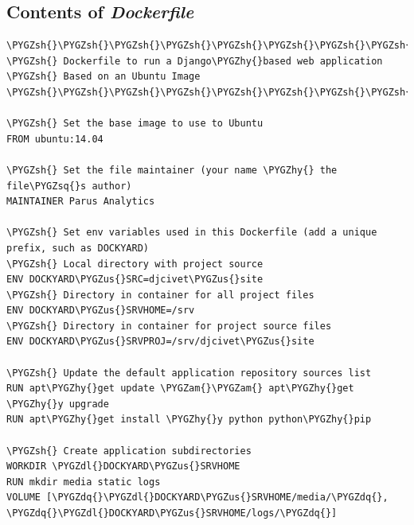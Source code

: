 \documentclass[letterpaper,10pt,english]{sphinxmanual}
\def\PYGZus{\char`\_}
\def\PYGZam{\char`\&}
\def\PYGZsh{\char`\#}
\def\PYGZdl{\char`\$}
\def\PYGZhy{\char`\-}
\def\PYGZsq{\char`\'}
\def\PYGZdq{\char`\"}
\renewcommand\PYGZsq{\textquotesingle}
\begin{document}
\subsection{Contents of \emph{Dockerfile}}
\label{appendix4:contents-of-dockerfile}
\begin{Verbatim}[commandchars=\\\{\}]
\PYGZsh{}\PYGZsh{}\PYGZsh{}\PYGZsh{}\PYGZsh{}\PYGZsh{}\PYGZsh{}\PYGZsh{}\PYGZsh{}\PYGZsh{}\PYGZsh{}\PYGZsh{}\PYGZsh{}\PYGZsh{}\PYGZsh{}\PYGZsh{}\PYGZsh{}\PYGZsh{}\PYGZsh{}\PYGZsh{}\PYGZsh{}\PYGZsh{}\PYGZsh{}\PYGZsh{}\PYGZsh{}\PYGZsh{}\PYGZsh{}\PYGZsh{}\PYGZsh{}\PYGZsh{}\PYGZsh{}\PYGZsh{}\PYGZsh{}\PYGZsh{}\PYGZsh{}\PYGZsh{}\PYGZsh{}\PYGZsh{}\PYGZsh{}\PYGZsh{}\PYGZsh{}\PYGZsh{}\PYGZsh{}\PYGZsh{}\PYGZsh{}\PYGZsh{}\PYGZsh{}\PYGZsh{}\PYGZsh{}\PYGZsh{}\PYGZsh{}\PYGZsh{}\PYGZsh{}\PYGZsh{}\PYGZsh{}\PYGZsh{}\PYGZsh{}\PYGZsh{}\PYGZsh{}\PYGZsh{}
\PYGZsh{} Dockerfile to run a Django\PYGZhy{}based web application
\PYGZsh{} Based on an Ubuntu Image
\PYGZsh{}\PYGZsh{}\PYGZsh{}\PYGZsh{}\PYGZsh{}\PYGZsh{}\PYGZsh{}\PYGZsh{}\PYGZsh{}\PYGZsh{}\PYGZsh{}\PYGZsh{}\PYGZsh{}\PYGZsh{}\PYGZsh{}\PYGZsh{}\PYGZsh{}\PYGZsh{}\PYGZsh{}\PYGZsh{}\PYGZsh{}\PYGZsh{}\PYGZsh{}\PYGZsh{}\PYGZsh{}\PYGZsh{}\PYGZsh{}\PYGZsh{}\PYGZsh{}\PYGZsh{}\PYGZsh{}\PYGZsh{}\PYGZsh{}\PYGZsh{}\PYGZsh{}\PYGZsh{}\PYGZsh{}\PYGZsh{}\PYGZsh{}\PYGZsh{}\PYGZsh{}\PYGZsh{}\PYGZsh{}\PYGZsh{}\PYGZsh{}\PYGZsh{}\PYGZsh{}\PYGZsh{}\PYGZsh{}\PYGZsh{}\PYGZsh{}\PYGZsh{}\PYGZsh{}\PYGZsh{}\PYGZsh{}\PYGZsh{}\PYGZsh{}\PYGZsh{}\PYGZsh{}\PYGZsh{}

\PYGZsh{} Set the base image to use to Ubuntu
FROM ubuntu:14.04

\PYGZsh{} Set the file maintainer (your name \PYGZhy{} the file\PYGZsq{}s author)
MAINTAINER Parus Analytics

\PYGZsh{} Set env variables used in this Dockerfile (add a unique prefix, such as DOCKYARD)
\PYGZsh{} Local directory with project source
ENV DOCKYARD\PYGZus{}SRC=djcivet\PYGZus{}site
\PYGZsh{} Directory in container for all project files
ENV DOCKYARD\PYGZus{}SRVHOME=/srv
\PYGZsh{} Directory in container for project source files
ENV DOCKYARD\PYGZus{}SRVPROJ=/srv/djcivet\PYGZus{}site

\PYGZsh{} Update the default application repository sources list
RUN apt\PYGZhy{}get update \PYGZam{}\PYGZam{} apt\PYGZhy{}get \PYGZhy{}y upgrade
RUN apt\PYGZhy{}get install \PYGZhy{}y python python\PYGZhy{}pip

\PYGZsh{} Create application subdirectories
WORKDIR \PYGZdl{}DOCKYARD\PYGZus{}SRVHOME
RUN mkdir media static logs
VOLUME [\PYGZdq{}\PYGZdl{}DOCKYARD\PYGZus{}SRVHOME/media/\PYGZdq{}, \PYGZdq{}\PYGZdl{}DOCKYARD\PYGZus{}SRVHOME/logs/\PYGZdq{}]


\end{Verbatim}
\end{document}
